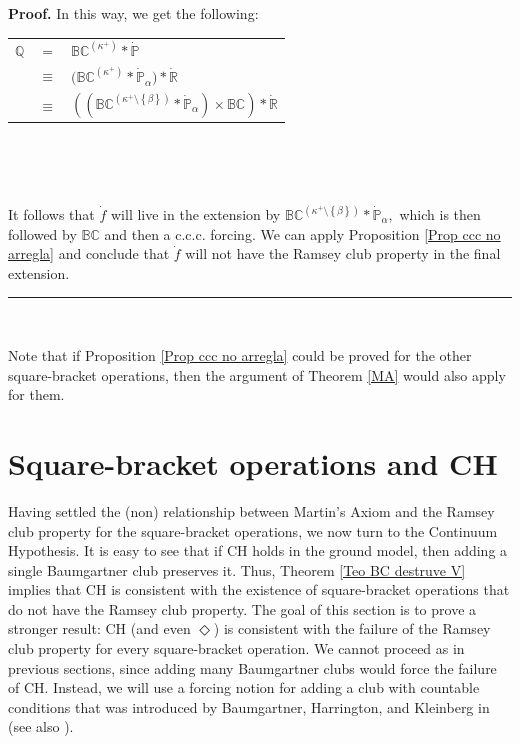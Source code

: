\documentclass{article}
\newenvironment{proof}[1][Proof]{\noindent\textbf{#1.} }{\ \rule{0.5em}{0.5em}}
\begin{document}
\begin{proof}
In this way, we get the following:\medskip

\hfill%
\begin{tabular}
[c]{lll}%
$\mathbb{Q}$ & $=$ & $\mathbb{BC}^{(\kappa^{+})}\ast\mathbb{\dot{P}}$\\
& $\mathbb{\equiv}$ & $\mathbb{(BC}^{(\kappa^{+})}\ast\mathbb{\dot{P}}%
_{\alpha})\ast\mathbb{\dot{R}}$\\
& $\mathbb{\equiv}$ & $((\mathbb{BC}^{(\kappa^{+}\setminus\left\{
\beta\right\}  )}\ast\mathbb{\dot{P}}_{\alpha})\times\mathbb{BC}%
)\ast\mathbb{\dot{R}}$%
\end{tabular}
\hfill\ 

\qquad\ \qquad\ \ \ \qquad\ \ \ \ \ \qquad\ \medskip

It follows that $\dot{f}$ will live in the extension by $\mathbb{BC}%
^{(\kappa^{+}\setminus\left\{  \beta\right\}  )}\ast\mathbb{\dot{P}}_{\alpha
},$ which is then followed by $\mathbb{BC}$ and then a \textsf{c.c.c.
}forcing. We can apply Proposition \ref{Prop ccc no arregla} and conclude that
$\dot{f}$ will not have the Ramsey club property in the final extension.
\end{proof}

\ \ \ \ \ \qquad\qquad\qquad\ \ 

Note that if Proposition \ref{Prop ccc no arregla} could be proved for the
other square-bracket operations, then the argument of Theorem \ref{MA} would
also apply for them.

\section{Square-bracket operations and CH}

Having settled the (non) relationship between Martin's Axiom and the Ramsey
club property for the square-bracket operations, we now turn to the Continuum
Hypothesis. It is easy to see that if \textsf{CH }holds in the ground model,
then adding a single Baumgartner club preserves it. Thus, Theorem
\ref{Teo BC destruve V} implies that \textsf{CH }is consistent with the
existence of square-bracket operations that do not have the Ramsey club
property. The goal of this section is to prove a stronger result: \textsf{CH
}(and even $\Diamond$) is consistent with the failure of the Ramsey club
property for every square-bracket operation. We cannot proceed as in previous
sections, since adding many Baumgartner clubs would force the failure of
\textsf{CH}. Instead, we will use a forcing notion for adding a club with
countable conditions that was introduced by Baumgartner, Harrington, and
Kleinberg in \cite{AddingaClub} (see also \cite{TasteofGoldstern}).
\end{document}
